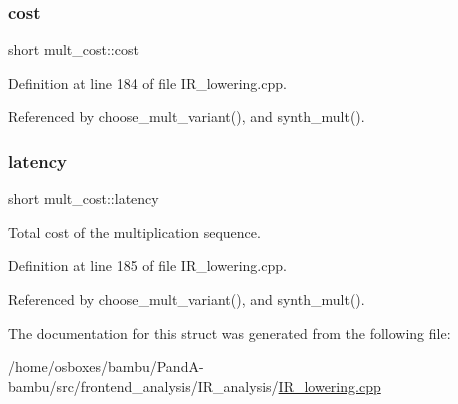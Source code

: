 \subsubsection{\texorpdfstring{cost}{cost}}
{\footnotesize\ttfamily short mult\+\_\+cost\+::cost}



Definition at line 184 of file I\+R\+\_\+lowering.\+cpp.



Referenced by choose\+\_\+mult\+\_\+variant(), and synth\+\_\+mult().

\mbox{\label{structmult__cost_af78d661d66339eb8b2e6e189be9ba4c3}} 
\subsubsection{\texorpdfstring{latency}{latency}}
{\footnotesize\ttfamily short mult\+\_\+cost\+::latency}



Total cost of the multiplication sequence. 



Definition at line 185 of file I\+R\+\_\+lowering.\+cpp.



Referenced by choose\+\_\+mult\+\_\+variant(), and synth\+\_\+mult().



The documentation for this struct was generated from the following file\+:\begin{DoxyCompactItemize}
\item 
/home/osboxes/bambu/\+Pand\+A-\/bambu/src/frontend\+\_\+analysis/\+I\+R\+\_\+analysis/\hyperlink{IR__lowering_8cpp}{I\+R\+\_\+lowering.\+cpp}\end{DoxyCompactItemize}
